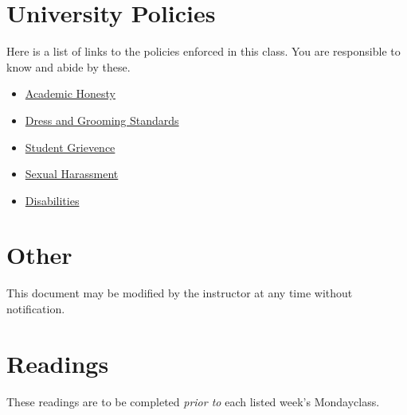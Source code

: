 \documentclass[12pt]{amsart}
\begin{document}
\section{University Policies}
Here is a list of links to the policies enforced in this class. You are responsible to know and abide by these.
\begin{itemize}

\item \href{http://www.byui.edu/catalog/#/policy/HJPtItSal?bc=true&bcCurrent=Academic Honesty&bcGroup=University Standards&bcItemType=policies}{Academic Honesty}
\item \href{http://www.byui.edu/catalog/#/policy/SkaRPKHTl?bc=true&bcCurrent=Dress and Grooming Standards&bcGroup=University Standards&bcItemType=policies}{Dress and Grooming Standards}
\item \href{http://www.byui.edu/catalog/#/policy/SJ8pMAmZr?bc=true&bcCurrent=Student Grievance&bcGroup=Academic Grievance Policy&bcItemType=policies}{Student Grievence}
\item \href{http://www.byui.edu/titleix/faculty-resources}{Sexual Harassment}
\item \href{http://www.byui.edu/disability-services/syllabus-statement}{Disabilities}

\end{itemize}

\section{Other}
This document may be modified by the instructor at any time without notification.
\section{Readings}
These readings are to be completed \textit{prior to} each listed week's Mondayclass.
\end{document}
